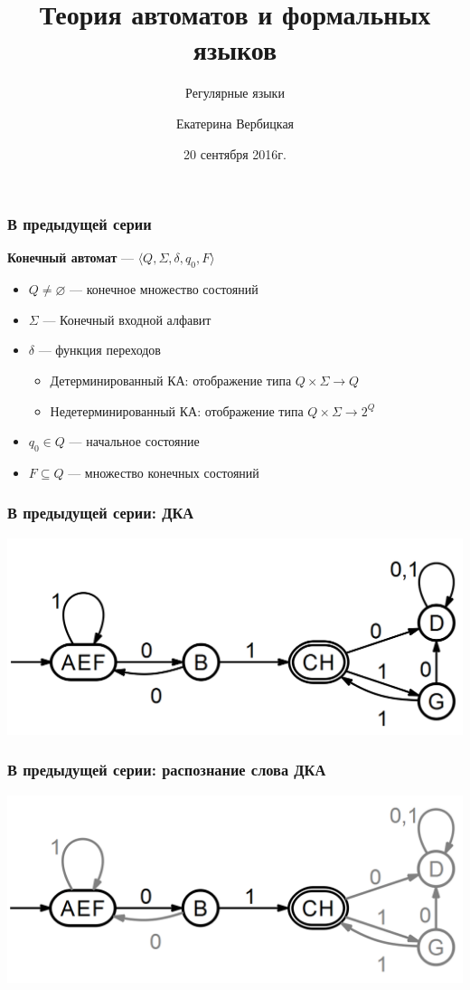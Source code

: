 \documentclass{beamer}
\title[]{Теория автоматов и формальных языков}
\subtitle[]{Регулярные языки}
\institute[]{
Санкт-Петербургский государственный электротехнический университет <<ЛЭТИ>>\\
}
\author[]{Екатерина Вербицкая}
\date{20 сентября 2016г.}
\begin{document}
{
  \begin{frame}
    \titlepage
  \end{frame}
}


\begin{frame}[fragile]
  \transwipe[direction=90]
  \frametitle{В предыдущей серии}
  \textbf{Конечный автомат} --- $\langle Q, \Sigma, \delta, q_0, F \rangle$
  \begin{itemize}
    \item $Q \neq \varnothing$ --- конечное множество состояний
    \item $\Sigma$ --- Конечный входной алфавит
    \item $\delta$ --- функция переходов
    \begin{itemize}
      \item Детерминированный КА: отображение типа $Q \times \Sigma \rightarrow Q$
      \item Недетерминированный КА: отображение типа $Q \times \Sigma \rightarrow 2^Q$
    \end{itemize}
    \item $q_0 \in Q$ --- начальное состояние
    \item $F \subseteq Q$ --- множество конечных состояний
  \end{itemize}
\end{frame}

\begin{frame}[fragile]
  \transwipe[direction=90]
  \frametitle{В предыдущей серии: ДКА}
  \begin{center}
  \includegraphics[width=\textwidth]{pics/det.png}  
  \end{center}
\end{frame}

\begin{frame}[fragile]
  \transwipe[direction=90]
  \frametitle{В предыдущей серии: распознание слова ДКА}
  \begin{center}
  \includegraphics[width=\textwidth]{pics/path1.png}  
  \end{center}
\end{frame}
\end{document}

